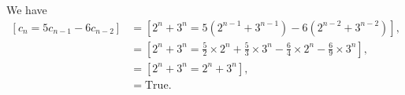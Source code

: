 \documentclass[12pt,fleqn]{exam}
\begin{document}
\begin{questions}
\begin{solution}[2.5in] We have
\begin{align*}
  \left[ c_n = 5 c_{n-1}-6 c_{n-2} \right] &= \left[  2^n +3^n = 5 ( 2^{n-1} +3^{n-1}) - 6 (  2^{n-2} +3^{n-2} ) \right], \\
                                                                      &=  \left[  2^n +3^n = \frac{5}{2}  \times  2^{n} + \frac{5}{3} \times 3^{n} - \frac{6}{4}   \times 2^n - \frac{6}{9} \times 3^n \right],\\
              &=\left[  2^n +3^n = 2^n +3^n     \right], \\
              &= \text{True}.                                                    
\end{align*}
\end{solution}

  \end{questions}
\end{document}
